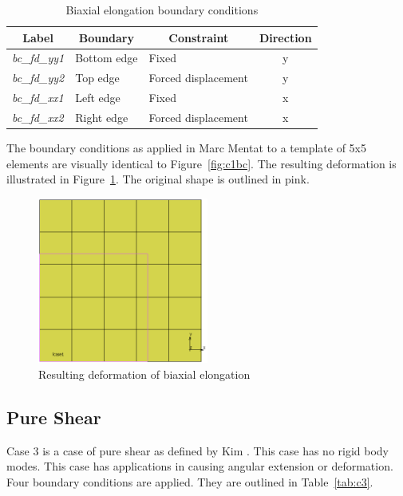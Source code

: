 \begin{table}[H]
\centering
\begin{tabular}{@{}lllc@{}}
\toprule
\multicolumn{1}{c}{\textbf{Label}} & \multicolumn{1}{c}{\textbf{Boundary}} & \multicolumn{1}{c}{\textbf{Constraint}} & \textbf{Direction} \\ \midrule
\textit{bc\_fd\_yy1} & Bottom edge & Fixed               & y \\
\textit{bc\_fd\_yy2} & Top edge    & Forced displacement & y \\
\textit{bc\_fd\_xx1} & Left edge   & Fixed               & x \\
\textit{bc\_fd\_xx2} & Right edge  & Forced displacement & x \\ \bottomrule
\end{tabular}
\caption{Biaxial elongation boundary conditions}
\label{tab:c2}
\end{table}

The boundary conditions as applied in Marc Mentat to a template of 5x5 elements are visually identical to Figure~\ref{fig:c1bc}. The resulting deformation is illustrated in Figure~\ref{fig:c2def}. The original shape is outlined in pink.

\begin{figure}[H]
	\centering
	\includegraphics[width=0.5\textwidth]{C2Def.png}
	\caption{Resulting deformation of biaxial elongation}
	\label{fig:c2def}
\end{figure}

\subsection{Pure Shear}

Case 3 is a case of pure shear as defined by Kim \cite{Kim2015}. This case has no rigid body modes. This case has applications in causing angular extension or deformation. Four boundary conditions are applied. They are outlined in Table~\ref{tab:c3}.

